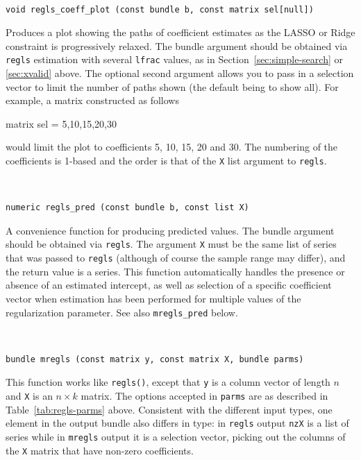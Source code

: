 \documentclass{article}
\newenvironment{funcdoc}
{\noindent\hrulefill\\[-12pt]}
{\medbreak}
\begin{document}
\begin{funcdoc}
\begin{verbatim}
void regls_coeff_plot (const bundle b, const matrix sel[null])
\end{verbatim}
  Produces a plot showing the paths of coefficient estimates as the
  LASSO or Ridge constraint is progressively relaxed. The bundle
  argument should be obtained via \texttt{regls} estimation with
  several \texttt{lfrac} values, as in Section~\ref{sec:simple-search}
  or \ref{sec:xvalid} above. The optional second argument allows you
  to pass in a selection vector to limit the number of paths shown
  (the default being to show all). For example, a matrix constructed
  as follows
\begin{code}
   matrix sel = {5,10,15,20,30}
\end{code}
  would limit the plot to coefficients 5, 10, 15, 20 and 30. The
  numbering of the coefficients is 1-based and the order is that of
  the \texttt{X} list argument to \texttt{regls}.
\end{funcdoc}

\begin{funcdoc}
\begin{verbatim}
numeric regls_pred (const bundle b, const list X)
\end{verbatim}
  A convenience function for producing predicted values. The bundle
  argument should be obtained via \texttt{regls}. The argument
  \texttt{X} must be the same list of series that was passed to
  \texttt{regls} (although of course the sample range may differ), and
  the return value is a series. This function automatically handles
  the presence or absence of an estimated intercept, as well as
  selection of a specific coefficient vector when estimation has been
  performed for multiple values of the regularization parameter.  See
  also \texttt{mregls\_pred} below.
\end{funcdoc}

\begin{funcdoc}
\begin{verbatim}
bundle mregls (const matrix y, const matrix X, bundle parms)
\end{verbatim}
  This function works like \texttt{regls()}, except that \texttt{y} is
  a column vector of length $n$ and \texttt{X} is an $n \times k$
  matrix. The options accepted in \texttt{parms} are as described in
  Table~\ref{tab:regls-parms} above. Consistent with the different
  input types, one element in the output bundle also differs in type:
  in \texttt{regls} output \texttt{nzX} is a list of series while in
  \texttt{mregls} output it is a selection vector, picking out the
  columns of the \texttt{X} matrix that have non-zero coefficients.
\end{funcdoc}
\end{document}
